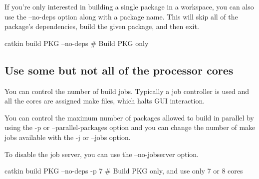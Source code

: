 If you’re only interested in building a single package in a workspace, you can also use the --no-\/deps option along with a package name. This will skip all of the package’s dependencies, build the given package, and then exit. \begin{DoxyVerb}catkin build PKG --no-deps # Build PKG only
\end{DoxyVerb}


\subsection*{Use some but not all of the processor cores }

You can control the number of build jobs. Typically a job controller is used and all the cores are assigned make files, which halts G\-U\-I interaction.

You can control the maximum number of packages allowed to build in parallel by using the -\/p or --parallel-\/packages option and you can change the number of make jobs available with the -\/j or --jobs option.

To disable the job server, you can use the --no-\/jobserver option. \begin{DoxyVerb}catkin build PKG --no-deps -p 7 # Build PKG only, and use only 7 or 8 cores\end{DoxyVerb}
 